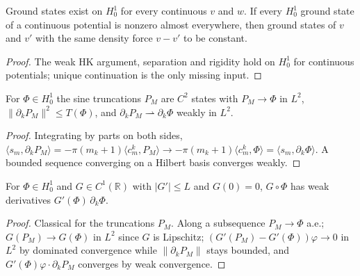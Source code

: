 \begin{theorem}
  \label{thm:line_hk_cont_ucp}
  \leanok
  Ground states exist on $H^1_0$ for every continuous $v$ and $w$. If every $H^1_0$ ground state of a continuous
  potential is nonzero almost everywhere, then ground states of $v$ and $v'$ with the same density force $v-v'$ to be
  constant.
\end{theorem}
\begin{proof}
  \leanok
  The weak HK argument, separation and rigidity hold on $H^1_0$ for continuous potentials; unique continuation is the
  only missing input.
\end{proof}

\begin{lemma}
  \label{lem:line_h1_approx}
  \leanok
  For $\Phi\in H^1_0$ the sine truncations $P_M$ are $C^2$ states with $P_M\to\Phi$ in $L^2$, $\|\partial_kP_M\|^2\le
  T(\Phi)$, and $\partial_kP_M\rightharpoonup\partial_k\Phi$ weakly in $L^2$.
\end{lemma}
\begin{proof}
  \leanok
  Integrating by parts on both sides, $\langle s_m,\partial_kP_M\rangle=-\pi(m_k+1)\langle c^k_m,P_M\rangle\to
  -\pi(m_k+1)\langle c^k_m,\Phi\rangle=\langle s_m,\partial_k\Phi\rangle$. A bounded sequence converging on a Hilbert
  basis converges weakly.
\end{proof}

\begin{lemma}
  \label{lem:line_chain}
  \leanok
  For $\Phi\in H^1_0$ and $G\in C^1(\mathbb R)$ with $|G'|\le L$ and $G(0)=0$, $G\circ\Phi$ has weak derivatives
  $G'(\Phi)\,\partial_k\Phi$.
\end{lemma}
\begin{proof}
  \leanok
  Classical for the truncations $P_M$. Along a subsequence $P_M\to\Phi$ a.e.; $G(P_M)\to G(\Phi)$ in $L^2$ since $G$ is
  Lipschitz; $(G'(P_M)-G'(\Phi))\varphi\to0$ in $L^2$ by dominated convergence while $\|\partial_kP_M\|$ stays bounded,
  and $G'(\Phi)\varphi\cdot\partial_kP_M$ converges by weak convergence.
\end{proof}

